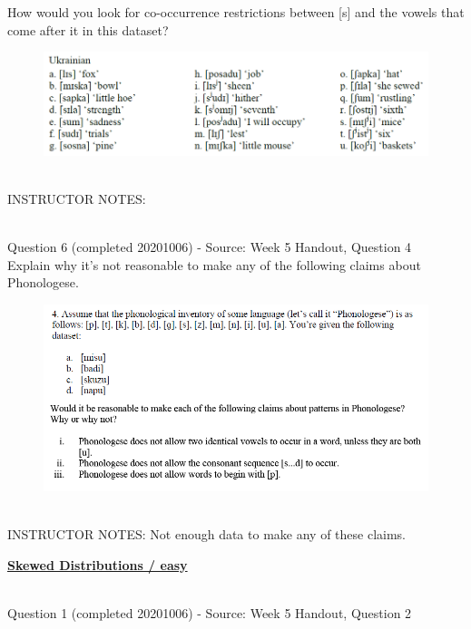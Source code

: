 \documentclass[12pt]{article}
\begin{document}
How would you look for co-occurrence restrictions between [s] and the vowels that come after it in this dataset?\\

\begin{figure}[H]
\includegraphics{../images/ukrainian.png}
\end{figure}

~\\
INSTRUCTOR NOTES: 


~\\

{\large Question 6} (completed 20201006) - Source: Week 5 Handout, Question 4\\

Explain why it's not reasonable to make any of the following claims about Phonologese.\\

\begin{figure}[H]
\includegraphics{../images/Phonologese.png}
\end{figure}

~\\
INSTRUCTOR NOTES: Not enough data to make any of these claims.


\newpage\textbf{\underline{\huge Skewed Distributions / easy\\}}

~\\

{\large Question 1} (completed 20201006) - Source: Week 5 Handout, Question 2\\
\end{document}
